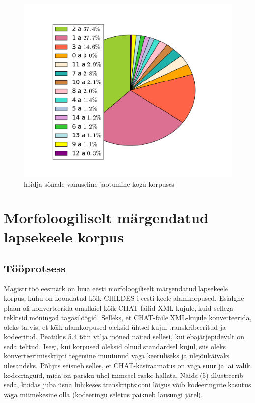 \documentclass[12pt]{article}
\begin{document}
\begin{figure}[H]
    \centering
    \includegraphics[width=\textwidth]{vanus_hoidja_sonad}
    \caption{hoidja sõnade vanuseline jaotumine kogu korpuses}
\end{figure}



\newpage

\section{Morfoloogiliselt märgendatud lapsekeele korpus}

\subsection{Tööprotsess}

Magistritöö eesmärk on luua eesti morfoloogiliselt märgendatud lapsekeele korpus, kuhu on koondatud kõik CHILDES-i eesti keele alamkorpused. Esialgne plaan oli konverteerida omalkäel kõik CHAT-failid XML-kujule, kuid sellega tekkisid mõningad tagasilöögid. Selleks, et CHAT-faile XML-kujule konverteerida, oleks tarvis, et kõik alamkorpused oleksid ühtsel kujul transkribeeritud ja kodeeritud. Peatükis 5.4 tõin välja mõned näited sellest, kui ebajärjepidevalt on seda tehtud. Isegi, kui korpused oleksid olnud standardsel kujul, siis oleks konverteerimisskripti tegemine muutunud väga keeruliseks ja ülejõukäivaks ülesandeks. Põhjus seisneb selles, et CHAT-käsiraamatus on väga suur ja lai valik kodeeringuid, mida on paraku ühel inimesel raske hallata. Näide (5) illustreerib seda, kuidas juba üsna lühikeses transkriptsiooni lõigus võib kodeeringute kasutus väga mitmekesine olla (kodeeringu seletus paikneb lausungi järel).
\end{document}
